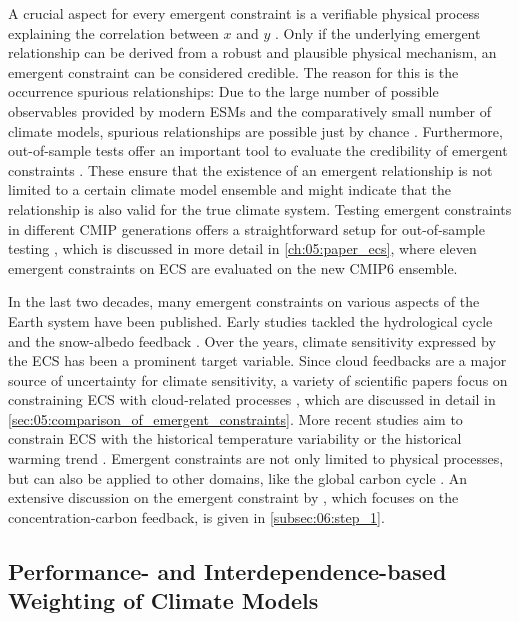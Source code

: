 A crucial aspect for every emergent constraint is a verifiable physical process
explaining the correlation between $x$ and $y$ \autocite{Hall2019}. Only if the
underlying emergent relationship can be derived from a robust and plausible
physical mechanism, an emergent constraint can be considered credible. The
reason for this is the occurrence spurious relationships: Due to the large
number of possible observables provided by modern \acp{ESM} and the
comparatively small number of climate models, spurious relationships are
possible just by chance \autocite{Caldwell2014}. Furthermore, out-of-sample
tests offer an important tool to evaluate the credibility of emergent
constraints \autocite{Hall2019}. These ensure that the existence of an emergent
relationship is not limited to a certain climate model ensemble and might
indicate that the relationship is also valid for the true climate system.
Testing emergent constraints in different \ac{CMIP} generations offers a
straightforward setup for out-of-sample testing \autocite{Caldwell2018}, which
is discussed in more detail in \cref{ch:05:paper_ecs}, where eleven emergent
constraints on \ac{ECS} are evaluated on the new \acs{CMIP}6 ensemble.

In the last two decades, many emergent constraints on various aspects of the
Earth system have been published. Early studies tackled the hydrological cycle
\autocite{Allen2002} and the snow-albedo feedback \autocite{Hall2006}. Over the
years, climate sensitivity expressed by the \ac{ECS} has been a prominent
target variable. Since cloud feedbacks are a major source of uncertainty for
climate sensitivity, a variety of scientific papers focus on constraining
\ac{ECS} with cloud-related processes \autocite{Brient2015, Brient2016,
  Fasullo2012, Lipat2017, Sherwood2014, Su2014, Tian2015, Volodin2008, Qu2013,
  Zhai2015}, which are discussed in detail in
\cref{sec:05:comparison_of_emergent_constraints}. More recent studies aim to
constrain \ac{ECS} with the historical temperature variability
\autocite{Cox2018} or the historical warming trend
\autocite{JimenezdelaCuesta2019, Nijsse2020, Tokarska2020}. Emergent
constraints are not only limited to physical processes, but can also be applied
to other domains, like the global carbon cycle \autocite{Cox2013,
  Kwiatkowski2017, Wenzel2014, Wenzel2016, Winkler2019}. An extensive
discussion on the emergent constraint by \textcite{Wenzel2016}, which focuses
on the concentration-carbon feedback, is given in \cref{subsec:06:step_1}.


\subsection{Performance- and Interdependence-based Weighting of Climate Models}
\label{subsec:02:model_weighting}

